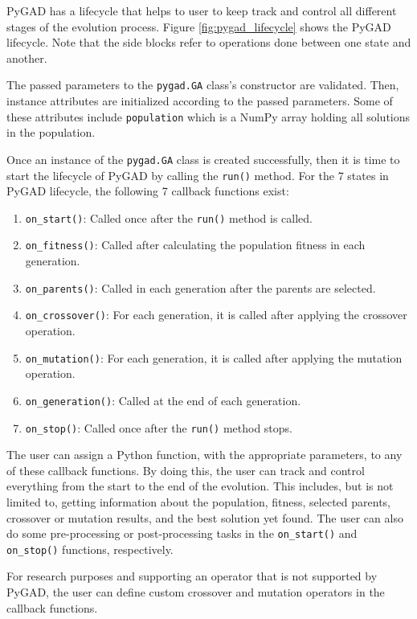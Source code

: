 \documentclass[conference]{IEEEtran}
\begin{document}
PyGAD has a lifecycle that helps to user to keep track and control all different stages of the evolution process. Figure \ref{fig:pygad_lifecycle} shows the PyGAD lifecycle. Note that the side blocks refer to operations done between one state and another.

The passed parameters to the \texttt{pygad.GA} class's constructor are validated. Then, instance attributes are initialized according to the passed parameters. Some of these attributes include \texttt{population} which is a NumPy array holding all solutions in the population.

Once an instance of the \texttt{pygad.GA} class is created successfully, then it is time to start the lifecycle of PyGAD by calling the \texttt{run()} method. For the 7 states in PyGAD lifecycle, the following 7 callback functions exist:
\begin{enumerate}
    \item \texttt{on\_start()}: Called once after the \texttt{run()} method is called.
    \item \texttt{on\_fitness()}: Called after calculating the population fitness in each generation.
    \item \texttt{on\_parents()}: Called in each generation after the parents are selected.
    \item \texttt{on\_crossover()}: For each generation, it is called after applying the crossover operation.
    \item \texttt{on\_mutation()}: For each generation, it is called after applying the mutation operation.
    \item \texttt{on\_generation()}: Called at the end of each generation.
    \item \texttt{on\_stop()}: Called once after the \texttt{run()} method stops.
\end{enumerate}

The user can assign a Python function, with the appropriate parameters, to any of these callback functions. By doing this, the user can track and control everything from the start to the end of the evolution. This includes, but is not limited to, getting information about the population, fitness, selected parents, crossover or mutation results, and the best solution yet found. The user can also do some pre-processing or post-processing tasks in the \texttt{on\_start()} and \texttt{on\_stop()} functions, respectively. 

For research purposes and supporting an operator that is not supported by PyGAD, the user can define custom crossover and mutation operators in the callback functions. 
\end{document}
